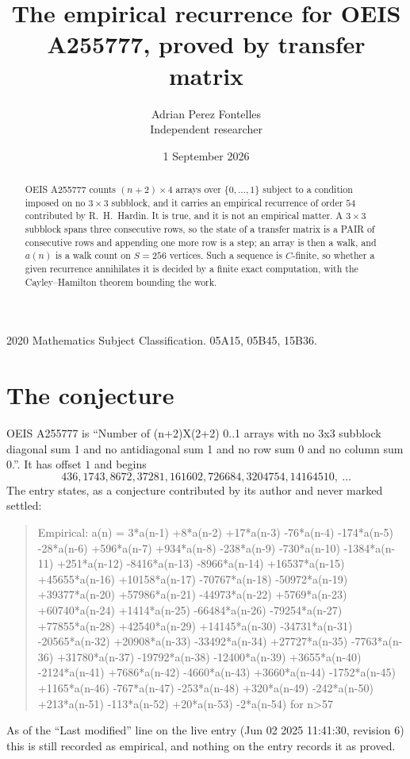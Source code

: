 \documentclass[11pt,a4paper]{article}
\title{The empirical recurrence for OEIS A255777, proved by transfer matrix}
\author{Adrian Perez Fontelles\\ \small Independent researcher}
\date{1 September 2026}
\theoremstyle{plain}
\theoremstyle{definition}
\begin{document}
\maketitle

\begin{abstract}
OEIS A255777 counts $(n+2)\times4$ arrays over $\{0,\dots,1\}$ subject to a condition imposed on
no $3\times3$ subblock, and it carries an empirical recurrence of order $54$
contributed by R.~H.~Hardin. It is true, and it is not an empirical matter. A $3\times3$
subblock spans three consecutive rows, so the state of a transfer matrix is a PAIR of
consecutive rows and appending one more row is a step; an array is then a walk, and
$a(n)$ is a walk count on $S=256$ vertices. Such a sequence is $C$-finite, so whether a given
recurrence annihilates it is decided by a finite exact computation, with the Cayley--Hamilton
theorem bounding the work.
\end{abstract}

\noindent\small 2020 Mathematics Subject Classification. 05A15, 05B45, 15B36.\normalsize

\section{The conjecture}

OEIS A255777 is ``Number of (n+2)X(2+2) 0..1 arrays with no 3x3 subblock diagonal sum 1 and no antidiagonal sum 1 and no row sum 0 and no column sum 0.''. It has offset $1$ and begins
\[
436, 1743, 8672, 37281, 161602, 726684, 3204754, 14164510,\ \dots
\]
The entry states, as a conjecture contributed by its author and never marked settled:
\begin{quote}
Empirical: a(n) = 3*a(n-1) +8*a(n-2) +17*a(n-3) -76*a(n-4) -174*a(n-5) -28*a(n-6) +596*a(n-7) +934*a(n-8) -238*a(n-9) -730*a(n-10) -1384*a(n-11) +251*a(n-12) -8416*a(n-13) -8966*a(n-14) +16537*a(n-15) +45655*a(n-16) +10158*a(n-17) -70767*a(n-18) -50972*a(n-19) +39377*a(n-20) +57986*a(n-21) -44973*a(n-22) +5769*a(n-23) +60740*a(n-24) +1414*a(n-25) -66484*a(n-26) -79254*a(n-27) +77855*a(n-28) +42540*a(n-29) +14145*a(n-30) -34731*a(n-31) -20565*a(n-32) +20908*a(n-33) -33492*a(n-34) +27727*a(n-35) -7763*a(n-36) +31780*a(n-37) -19792*a(n-38) -12400*a(n-39) +3655*a(n-40) -2124*a(n-41) +7686*a(n-42) -4660*a(n-43) +3660*a(n-44) -1752*a(n-45) +1165*a(n-46) -767*a(n-47) -253*a(n-48) +320*a(n-49) -242*a(n-50) +213*a(n-51) -113*a(n-52) +20*a(n-53) -2*a(n-54) for n>57
\end{quote}
As of the ``Last modified'' line on the live entry (Jun 02 2025 11:41:30, revision 6) this is still
recorded as empirical, and nothing on the entry records it as proved.
\end{document}
